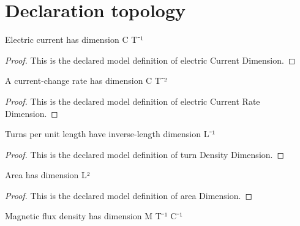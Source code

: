 \section{Declaration topology}
\begin{definition}
  \label{def:physics:phyx-mini-0938:phyxminiproblems-problemphyxmini0938-electriccurrentdimension}
  Electric current has dimension C T⁻¹
\end{definition}
\begin{proof}
  This is the declared model definition of electric Current Dimension.
\end{proof}
\begin{definition}
  \label{def:physics:phyx-mini-0938:phyxminiproblems-problemphyxmini0938-electriccurrentratedimension}
  A current-change rate has dimension C T⁻²
\end{definition}
\begin{proof}
  This is the declared model definition of electric Current Rate Dimension.
\end{proof}
\begin{definition}
  \label{def:physics:phyx-mini-0938:phyxminiproblems-problemphyxmini0938-turndensitydimension}
  Turns per unit length have inverse-length dimension L⁻¹
\end{definition}
\begin{proof}
  This is the declared model definition of turn Density Dimension.
\end{proof}
\begin{definition}
  \label{def:physics:phyx-mini-0938:phyxminiproblems-problemphyxmini0938-areadimension}
  Area has dimension L²
\end{definition}
\begin{proof}
  This is the declared model definition of area Dimension.
\end{proof}
\begin{definition}
  \label{def:physics:phyx-mini-0938:phyxminiproblems-problemphyxmini0938-magneticfluxdensitydimension}
  Magnetic flux density has dimension M T⁻¹ C⁻¹
\end{definition}
